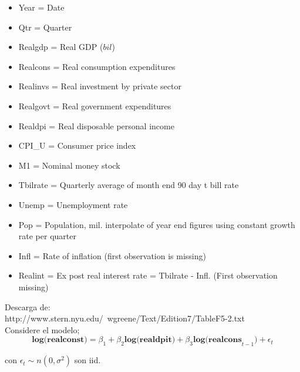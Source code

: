 \documentclass[12pt,a4paper]{report}
\begin{document}
\begin{itemize}
\item Year = Date
\item Qtr = Quarter
\item Realgdp = Real GDP ($bil$)
\item Realcons = Real consumption expenditures
\item Realinvs = Real investment by private sector
\item Realgovt = Real government expenditures
\item Realdpi = Real disposable personal income
\item CPI\_U = Consumer price index
\item M1 = Nominal money stock
\item Tbilrate = Quarterly average of month end 90 day t bill rate
\item Unemp = Unemployment rate
\item Pop = Population, mil. interpolate of year end figures using constant growth rate per quarter
\item Infl = Rate of inflation (first observation is missing)
\item Realint = Ex post real interest rate = Tbilrate - Infl. (First observation missing)
\end{itemize}
Descarga de:\\

http://www.stern.nyu.edu/~wgreene/Text/Edition7/TableF5-2.txt\\

Considere el modelo;\\

$$\textbf{log(realconst)}=\beta_{1}+ \beta_{2}\textbf{log(realdpit)} + \beta_{3}\textbf{log(realcons}_{t-1}) + \epsilon_{t} $$

con $\epsilon_{t}\sim n(0,\sigma^{2})$ son iid.\\
\end{document}
